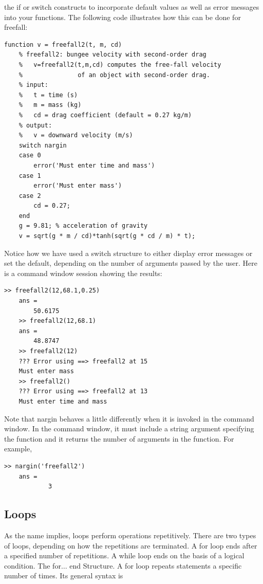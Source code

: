 \documentclass[../main.tex]{subfiles}
\begin{document}
the if or switch constructs to incorporate default values as well as error messages into
your functions. The following code illustrates how this can be done for freefall:

\begin{lstlisting}[frame=none, numbers=none]
    function v = freefall2(t, m, cd)
    % freefall2: bungee velocity with second-order drag
    %   v=freefall2(t,m,cd) computes the free-fall velocity
    %               of an object with second-order drag.
    % input:
    %   t = time (s)
    %   m = mass (kg)
    %   cd = drag coefficient (default = 0.27 kg/m)
    % output:
    %   v = downward velocity (m/s)
    switch nargin
    case 0
        error('Must enter time and mass')
    case 1
        error('Must enter mass')
    case 2
        cd = 0.27;
    end
    g = 9.81; % acceleration of gravity
    v = sqrt(g * m / cd)*tanh(sqrt(g * cd / m) * t);
\end{lstlisting}
Notice how we have used a switch structure to either display error messages or set the
default, depending on the number of arguments passed by the user. Here is a command
window session showing the results:
\begin{lstlisting}[frame=none, numbers=none]
    >> freefall2(12,68.1,0.25)
    ans =
        50.6175
    >> freefall2(12,68.1)
    ans =
        48.8747
    >> freefall2(12)
    ??? Error using ==> freefall2 at 15
    Must enter mass
    >> freefall2()
    ??? Error using ==> freefall2 at 13
    Must enter time and mass
\end{lstlisting}

Note that nargin behaves a little differently when it is invoked in the command
window. In the command window, it must include a string argument specifying the function and it returns the number of arguments in the function. For example,
\begin{lstlisting}[frame=none, numbers=none]
    >> nargin('freefall2')
    ans =
            3
\end{lstlisting}


\subsection{Loops}


As the name implies, loops perform operations repetitively. There are two types of loops,
depending on how the repetitions are terminated. A for loop ends after a specified number
of repetitions. A while loop ends on the basis of a logical condition.
The for$\ldots$ end Structure. A for loop repeats statements a specific number of times. Its
general syntax is
\end{document}
